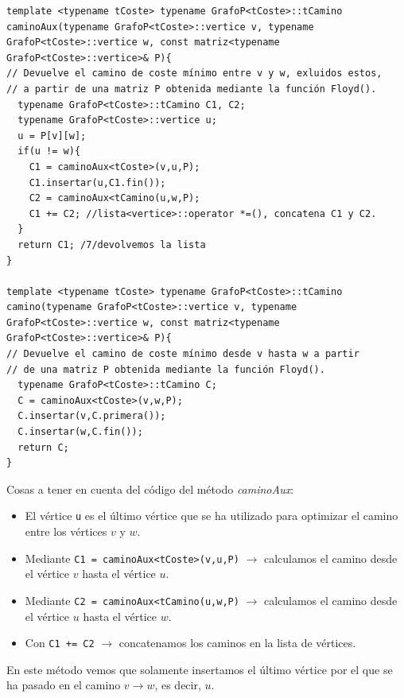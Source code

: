 \begin{verbatim}
template <typename tCoste> typename GrafoP<tCoste>::tCamino caminoAux(typename GrafoP<tCoste>::vertice v, typename GrafoP<tCoste>::vertice w, const matriz<typename GrafoP<tCoste>::vertice>& P){
// Devuelve el camino de coste mínimo entre v y w, exluidos estos,
// a partir de una matriz P obtenida mediante la función Floyd().
  typename GrafoP<tCoste>::tCamino C1, C2;
  typename GrafoP<tCoste>::vertice u;
  u = P[v][w];
  if(u != w){
    C1 = caminoAux<tCoste>(v,u,P);
    C1.insertar(u,C1.fin());
    C2 = caminoAux<tCamino(u,w,P);
    C1 += C2; //lista<vertice>::operator *=(), concatena C1 y C2.
  }
  return C1; /7/devolvemos la lista
}

template <typename tCoste> typename GrafoP<tCoste>::tCamino camino(typename GrafoP<tCoste>::vertice v, typename GrafoP<tCoste>::vertice w, const matriz<typename GrafoP<tCoste>::vertice>& P){
// Devuelve el camino de coste mínimo desde v hasta w a partir
// de una matriz P obtenida mediante la función Floyd().
  typename GrafoP<tCoste>::tCamino C;
  C = caminoAux<tCoste>(v,w,P);
  C.insertar(v,C.primera());
  C.insertar(w,C.fin());
  return C;
}
\end{verbatim}

Cosas a tener en cuenta del código del método \textit{caminoAux}:
\begin{itemize}
  \item El vértice \texttt{u} es el último vértice que se ha utilizado para optimizar el camino entre los vértices \(v\) y \(w\).
  \item Mediante \texttt{C1 = caminoAux<tCoste>(v,u,P)} \(\rightarrow\) calculamos el camino desde el vértice \(v\) hasta el vértice \(u\).
  \item Mediante \texttt{C2 = caminoAux<tCamino(u,w,P)} \(\rightarrow\) calculamos el camino desde el vértice \(u\) hasta el vértice \(w\).
  \item Con \texttt{C1 += C2} \(\rightarrow\) concatenamos los caminos en la lista de vértices.
 \end{itemize}
En este método vemos que solamente insertamos el último vértice por el que se ha pasado en el camino \(v \rightarrow w\), es decir, \(u\).
